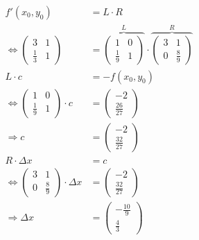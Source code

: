 \begin{align}
%
	f'(x_0,y_0)	&= L \cdot R \\
	\Leftrightarrow \begin{pmatrix}
		3     & 1\\
		\frac{1}{3} & 1
	\end{pmatrix}
	&=
	\overbrace{\begin{pmatrix}
		1      & 0\\
		\frac{1}{9} & 1
	\end{pmatrix}}^L \cdot 
	\overbrace{\begin{pmatrix}
		3 & 1\\
		0      & \frac{8}{9}
	\end{pmatrix}}^R\\
%
	L \cdot c	&= -f(x_0,y_0) \\
	\Leftrightarrow
	\begin{pmatrix}
		1      & 0\\
		\frac{1}{9} & 1
	\end{pmatrix}
	\cdot c
	&=
		\begin{pmatrix}
		-2\\
		\frac{26}{27}
	\end{pmatrix}\\
	\Rightarrow
	c &= 		\begin{pmatrix}
		-2\\
		\frac{32}{27}
	\end{pmatrix}\\
%
	R\cdot \Delta x &= c\\
	\Leftrightarrow
	\begin{pmatrix}
		3 & 1\\
		0      & \frac{8}{9}
	\end{pmatrix}
	\cdot \Delta x &=
	\begin{pmatrix}
		-2\\
		\frac{32}{27}
	\end{pmatrix}\\
	\Rightarrow \Delta x &= 
	\begin{pmatrix}
		-\frac{10}{9}\\
		\frac{4}{3}
	\end{pmatrix}
\end{align}

